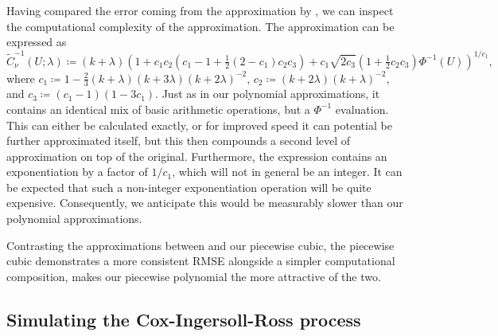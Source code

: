\documentclass[9pt,a4paper,english]{extarticle}
\begin{document}
Having compared the error coming from the approximation by \citet{sankaran1959non}, we can inspect the computational complexity of the approximation. The approximation can be expressed as
\begin{equation*}
\label{eqt:sankaran_approx}
\widetilde{C}^{-1}_{\nu}(U; \lambda) \coloneqq 
(k + \lambda) \left(1 + c_1 c_2\left(c_1 - 1 + \tfrac{1}{2}(2 - c_1) c_2 c_3\right) + c_1 \sqrt{2 c_3}\left(1 + \tfrac{1}{2}c_2 c_3\right) \Phi^{-1}(U) \right)^{{1}/{c_1}},
\end{equation*}
where $ c_1 \coloneqq 1 - \tfrac{2}{3}(k + \lambda)(k+3\lambda)(k + 2\lambda)^{-2} $, 
$ c_2 \coloneqq (k+2\lambda)(k + \lambda)^{-2} $, 
and $ c_3 \coloneqq (c_1 - 1)(1 - 3c_1) $. Just as in our polynomial approximations, it contains an identical mix of basic arithmetic operations, but a $ \Phi^{-1} $ evaluation. This can either be calculated exactly, or for improved speed it can potential be further approximated itself, but this then compounds a second level of approximation on top of the original. Furthermore, the expression contains an exponentiation by a factor of $ 1/c_1 $, which will not in general be an integer. It can be expected that such a non-integer exponentiation operation will be quite expensive. Consequently, we anticipate this would be measurably slower than our polynomial approximations. 

Contrasting the approximations between \citet{sankaran1959non} and our piecewise cubic, the piecewise cubic demonstrates a more consistent RMSE alongside a simpler computational composition, makes our piecewise polynomial the more attractive of the two. 

\subsection{Simulating the Cox-Ingersoll-Ross process}
\end{document}
